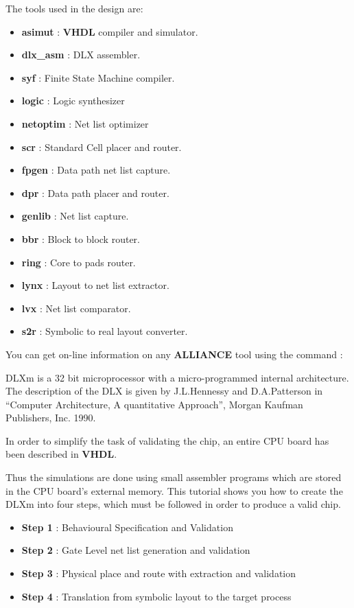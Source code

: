 The tools used in the design are:
\begin {itemize}
\item {\bf asimut} : {\bf VHDL} compiler and simulator.
\item {\bf dlx\_asm} : DLX assembler.
\item {\bf syf} : Finite State Machine compiler.
\item {\bf logic} : Logic synthesizer
\item {\bf netoptim} : Net list optimizer
\item {\bf scr} : Standard Cell placer and router.
\item {\bf fpgen} : Data path net list capture.
\item {\bf dpr} : Data path placer and router.
\item {\bf genlib} : Net list capture.
\item {\bf bbr} : Block to block router.
\item {\bf ring} : Core to pads router.
\item {\bf lynx} : Layout to net list extractor.
\item {\bf lvx} : Net list comparator.
\item {\bf s2r} : Symbolic to real layout converter.
\end{itemize}

You can get on-line information on any {\bf ALLIANCE} tool using the command :


DLXm is a 32 bit microprocessor with a micro-programmed internal architecture. The description of the DLX is given by J.L.Hennessy and D.A.Patterson in ``Computer Architecture, A quantitative Approach'', Morgan Kaufman Publishers, Inc. 1990.                                                            

In order to simplify the task of validating the chip, an entire CPU board has been described in {\bf VHDL}. 

Thus the simulations are done using small
assembler programs which are stored in the CPU board's external memory.
This tutorial shows you how to create the DLXm into four steps, 
which must be followed in order to produce a valid chip.

\begin {itemize}
\item {\bf Step 1} : Behavioural Specification and Validation 
\item {\bf Step 2} : Gate Level net list generation and validation 
\item {\bf Step 3} : Physical place and route with extraction and validation 
\item {\bf Step 4} : Translation from symbolic layout to the target
process
\end{itemize}

